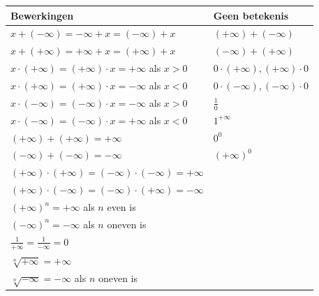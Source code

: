 \documentclass[a5paper]{article}
\begin{document}
\begin{tabular}{|>{\centering\arraybackslash}m{6.5cm}|>{\centering\arraybackslash}m{5cm}|}
\hline
\textbf{Bewerkingen} & \textbf{Geen betekenis} \\ \hline

\( x + (-\infty) = -\infty + x = (-\infty) + x \) &
\( (+\infty) + (-\infty) \) \\ \hline

\( x + (+\infty) = +\infty + x = (+\infty) + x \) &
\( (-\infty) + (+\infty) \) \\ \hline

\( x \cdot (+\infty) = (+\infty) \cdot x = +\infty \) als \( x > 0 \) &
\( 0 \cdot (+\infty), (+\infty) \cdot 0 \) \\ \hline

\( x \cdot (+\infty) = (+\infty) \cdot x = -\infty \) als \( x < 0 \) &
\( 0 \cdot (-\infty), (-\infty) \cdot 0 \) \\ \hline

\( x \cdot (-\infty) = (-\infty) \cdot x = -\infty \) als \( x > 0 \) &
\( \frac{1}{0} \) \\ \hline

\( x \cdot (-\infty) = (-\infty) \cdot x = +\infty \) als \( x < 0 \) &
\( 1^{+\infty} \) \\ \hline

\( (+\infty) + (+\infty) = +\infty \) &
\( 0^0 \) \\ \hline

\( (-\infty) + (-\infty) = -\infty \) &
\( (+\infty)^0 \) \\ \hline

\( (+\infty) \cdot (+\infty) = (-\infty) \cdot (-\infty) = +\infty \) &
\\ \hline

\( (+\infty) \cdot (-\infty) = (-\infty) \cdot (+\infty) = -\infty \) &
\\ \hline

\( (+\infty)^n = +\infty \) als \( n \) even is &
\\ \hline

\( (-\infty)^n = -\infty \) als \( n \) oneven is &
\\ \hline

\( \frac{1}{+\infty} = \frac{1}{-\infty} = 0 \) &
\\ \hline

\( \sqrt[n]{+\infty} = +\infty \) &
\\ \hline

\( \sqrt[n]{-\infty} = -\infty \) als \( n \) oneven is &
\\ \hline

\end{tabular}
\end{document}
